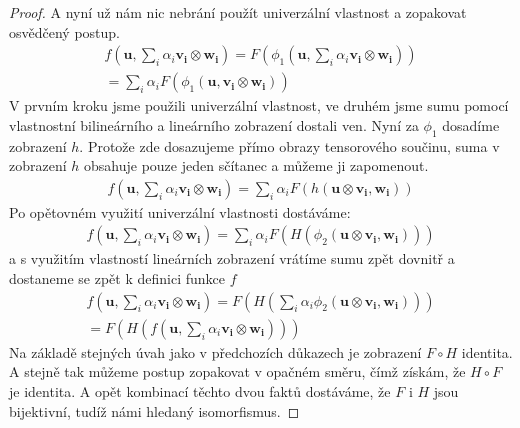 \documentclass[a5paper,12pt]{amsbook}
\theoremstyle{definition}
\newcommand{\myvec}[1]{\mathbf{#1}}
\begin{document}
\begin{proof}
\medskip\noindent
A nyní už nám nic nebrání použít univerzální vlastnost a zopakovat osvědčený postup.
\begin{equation*}
\begin{split}
f(\myvec{u}, \sum_{i}\alpha_i\myvec{v_i}\otimes\myvec{w_i}) 
  = F(\phi_1(\myvec{u}, \sum_{i}\alpha_i\myvec{v_i}\otimes\myvec{w_i})) \\
  = \sum_{i}\alpha_i F(\phi_1(\myvec{u}, \myvec{v_i}\otimes\myvec{w_i}))
\end{split}
\end{equation*}
V prvním kroku jsme použili univerzální vlastnost, ve druhém jsme sumu pomocí
vlastnostní bilineárního a lineárního zobrazení dostali ven. Nyní za $\phi_1$
dosadíme zobrazení $h$. Protože zde dosazujeme přímo obrazy tensorového součinu,
suma v zobrazení $h$ obsahuje pouze jeden sčítanec a můžeme ji zapomenout.
\begin{equation*}
\begin{split}
f(\myvec{u}, \sum_{i}\alpha_i\myvec{v_i}\otimes\myvec{w_i}) 
= \sum_{i}\alpha_i F(h(\myvec{u}\otimes\myvec{v_i}, \myvec{w_i}))
\end{split}
\end{equation*}
Po opětovném využití univerzální vlastnosti dostáváme:
\begin{equation*}
\begin{split}
f(\myvec{u}, \sum_{i}\alpha_i\myvec{v_i}\otimes\myvec{w_i}) 
= \sum_{i}\alpha_i F(H(\phi_2(\myvec{u}\otimes\myvec{v_i}, \myvec{w_i})))
\end{split}
\end{equation*}
a s využitím vlastností lineárních zobrazení vrátíme sumu zpět dovnitř a dostaneme
se zpět k definici funkce $f$
\begin{equation*}
\begin{split}
f(\myvec{u}, \sum_{i}\alpha_i\myvec{v_i}\otimes\myvec{w_i}) 
= F(H(\sum_{i}\alpha_i\phi_2(\myvec{u}\otimes\myvec{v_i}, \myvec{w_i}))) \\
= F(H(f(\myvec{u}, \sum_{i}\alpha_i\myvec{v_i}\otimes\myvec{w_i})))
\end{split}
\end{equation*}
Na základě stejných úvah jako v předchozích důkazech je zobrazení $F \circ H$ identita.
A stejně tak můžeme postup zopakovat v opačném směru, čímž získám, že $H \circ F$
je identita. A opět kombinací těchto dvou faktů dostáváme, že $F$ i $H$ jsou bijektivní,
tudíž námi hledaný isomorfismus.
\end{proof}
\end{document}
